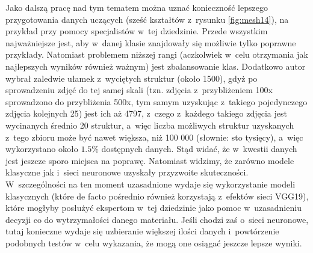 Jako dalszą pracę nad tym tematem można uznać konieczność lepszego przygotowania danych uczących (sześć kształtów z~rysunku \ref{fig:mesh14}), na przykład przy pomocy specjalistów w~tej dziedzinie. Przede wszystkim najważniejsze jest, aby w~danej klasie znajdowały się możliwie tylko poprawne przykłady. Natomiast problemem niższej rangi (aczkolwiek w~celu otrzymania jak najlepszych wyników również ważnym) jest zbalansowanie klas. Dodatkowo autor wybrał zaledwie ułamek z~wyciętych struktur (około 1500), gdyż po sprowadzeniu zdjęć do tej samej skali (tzn. zdjęcia z~przybliżeniem 100x sprowadzono do przybliżenia 500x, tym samym uzyskując z~takiego pojedynczego zdjęcia kolejnych 25) jest ich aż 4797, z~czego z~każdego takiego zdjęcia jest wycinanych średnio 20 struktur, a~więc liczba możliwych struktur uzyskanych z~tego zbioru może być nawet większa, niż 100 000 (słownie: sto tysięcy), a~więc wykorzystano około $1.5\%$ dostępnych danych. Stąd widać, że w~kwestii danych jest jeszcze sporo miejsca na poprawę. Natomiast widzimy, że zarówno modele klasyczne jak i~sieci neuronowe uzyskały przyzwoite skuteczności. W~szczególności na ten moment uzasadnione wydaje się wykorzystanie modeli klasycznych (które de facto pośrednio również korzystają z~efektów sieci VGG19), które mogłyby posłużyć ekspertom w~tej dziedzinie jako pomoc w~uzasadnieniu decyzji co do wytrzymałości danego materiału. Jeśli chodzi zaś o~sieci neuronowe, tutaj konieczne wydaje się uzbieranie większej ilości danych i~powtórzenie podobnych testów w~celu wykazania, że mogą one osiągać jeszcze lepsze wyniki. 